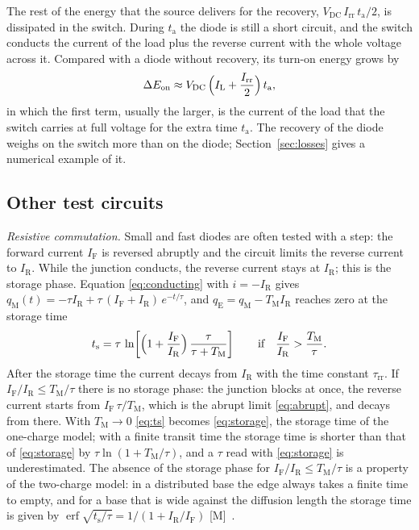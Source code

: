 \documentclass[10pt,a4paper]{scrartcl}
\newcommand{\IF}{I_\mathrm{F}}
\newcommand{\IR}{I_\mathrm{R}}
\newcommand{\Irr}{I_\mathrm{rr}}
\newcommand{\ta}{t_\mathrm{a}}
\newcommand{\ts}{t_\mathrm{s}}
\newcommand{\taurr}{\tau_\mathrm{rr}}
\newcommand{\TM}{T_\mathrm{M}}
\newcommand{\qE}{q_\mathrm{E}}
\newcommand{\qM}{q_\mathrm{M}}
\newcommand{\Vdc}{V_\mathrm{DC}}
\begin{document}
The rest of the energy that the source delivers for the recovery, $\Vdc\,\Irr\,\ta/2$, is dissipated in the switch. During $\ta$ the diode is still a short circuit, and the switch conducts the current of the load plus the reverse current with the whole voltage across it. Compared with a diode without recovery, its turn-on energy grows by
\begin{equation}
\Delta E_\mathrm{on} \approx \Vdc\,\Bigl(I_\mathrm{L} + \frac{\Irr}{2}\Bigr)\,\ta ,
\label{eq:eon}
\end{equation}
in which the first term, usually the larger, is the current of the load that the switch carries at full voltage for the extra time $\ta$. The recovery of the diode weighs on the switch more than on the diode; Section~\ref{sec:losses} gives a numerical example of it.
\subsection{Other test circuits}
\label{sec:othertests}
\emph{Resistive commutation.} Small and fast diodes are often tested with a step: the forward current $\IF$ is reversed abruptly and the circuit limits the reverse current to $\IR$. While the junction conducts, the reverse current stays at $\IR$; this is the storage phase. Equation \eqref{eq:conducting} with $i = -\IR$ gives $\qM(t) = -\tau\IR + \tau\,(\IF+\IR)\,e^{-t/\tau}$, and $\qE = \qM - \TM\IR$ reaches zero at the storage time
\begin{equation}
\ts = \tau\,\ln\!\left[\Bigl(1+\frac{\IF}{\IR}\Bigr)\,\frac{\tau}{\tau+\TM}\right] \qquad \text{if} \quad \frac{\IF}{\IR} > \frac{\TM}{\tau} .
\label{eq:ts}
\end{equation}
After the storage time the current decays from $\IR$ with the time constant $\taurr$. If $\IF/\IR \leq \TM/\tau$ there is no storage phase: the junction blocks at once, the reverse current starts from $\IF\,\tau/\TM$, which is the abrupt limit \eqref{eq:abrupt}, and decays from there. With $\TM \to 0$ \eqref{eq:ts} becomes \eqref{eq:storage}, the storage time of the one-charge model; with a finite transit time the storage time is shorter than that of \eqref{eq:storage} by $\tau\ln(1+\TM/\tau)$, and a $\tau$ read with \eqref{eq:storage} is underestimated. The absence of the storage phase for $\IF/\IR \leq \TM/\tau$ is a property of the two-charge model: in a distributed base the edge always takes a finite time to empty, and for a base that is wide against the diffusion length the storage time is given by $\operatorname{erf}\sqrt{\ts/\tau} = 1/(1+\IR/\IF)$ [M]~\cite{sze}.
\end{document}
